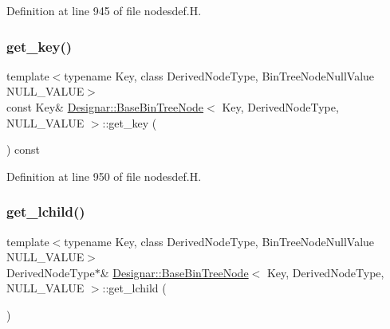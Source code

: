 Definition at line 945 of file nodesdef.\+H.

\mbox{\label{class_designar_1_1_base_bin_tree_node_ab836466417ce1dad15b794424f39ee4b}} 
\subsubsection{\texorpdfstring{get\+\_\+key()}{get\_key()}\hspace{0.1cm}{\footnotesize\ttfamily [2/2]}}
{\footnotesize\ttfamily template$<$typename Key, class Derived\+Node\+Type, Bin\+Tree\+Node\+Null\+Value N\+U\+L\+L\+\_\+\+V\+A\+L\+UE$>$ \\
const Key\& \hyperlink{class_designar_1_1_base_bin_tree_node}{Designar\+::\+Base\+Bin\+Tree\+Node}$<$ Key, Derived\+Node\+Type, N\+U\+L\+L\+\_\+\+V\+A\+L\+UE $>$\+::get\+\_\+key (\begin{DoxyParamCaption}{ }\end{DoxyParamCaption}) const\hspace{0.3cm}{\ttfamily [inline]}}



Definition at line 950 of file nodesdef.\+H.

\mbox{\label{class_designar_1_1_base_bin_tree_node_a60f8c88c08e4b68ecc9dd9a77b69cb7c}} 
\subsubsection{\texorpdfstring{get\+\_\+lchild()}{get\_lchild()}}
{\footnotesize\ttfamily template$<$typename Key, class Derived\+Node\+Type, Bin\+Tree\+Node\+Null\+Value N\+U\+L\+L\+\_\+\+V\+A\+L\+UE$>$ \\
Derived\+Node\+Type$\ast$\& \hyperlink{class_designar_1_1_base_bin_tree_node}{Designar\+::\+Base\+Bin\+Tree\+Node}$<$ Key, Derived\+Node\+Type, N\+U\+L\+L\+\_\+\+V\+A\+L\+UE $>$\+::get\+\_\+lchild (\begin{DoxyParamCaption}{ }\end{DoxyParamCaption})\hspace{0.3cm}{\ttfamily [inline]}}



